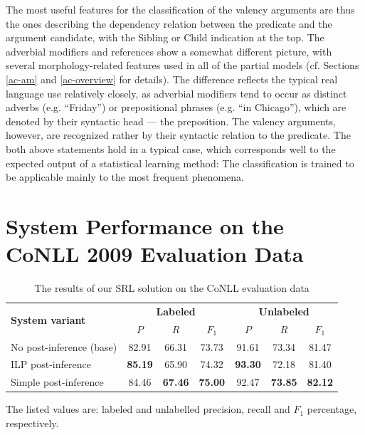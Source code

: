 \documentclass[12pt,notitlepage]{report}
\begin{document}
The most useful features for the classification of the valency arguments are thus the ones describing the dependency relation between the predicate and the argument candidate, with the Sibling or Child indication at the top. The adverbial modifiers and references show a somewhat different picture, with several morphology-related features used in all of the partial models (cf. Sections \ref{ac-am} and \ref{ac-overview} for details). The difference reflects the typical real language use relatively closely, as adverbial modifiers tend to occur as distinct adverbs (e.g. ``Friday'') or prepositional phrases (e.g. ``in Chicago''), which are denoted by their syntactic head --- the preposition. The valency arguments, however, are recognized rather by their syntactic relation to the predicate. The both above statements hold in a typical case, which corresponds well to the expected output of a statistical learning method: The classification is trained to be applicable mainly to the most frequent phenomena.

\section{System Performance on the CoNLL 2009 Evaluation Data}\label{performance}

\begin{table}[htb]\footnotesize
\caption{The results of our SRL solution on the CoNLL evaluation data}\label{tab:results}
\begin{center}
\begin{tabular}{|l|ccc|ccc|}\hline
\multirow{2}{*}{\bf System variant} & \multicolumn{3}{c|}{\bf Labeled} & \multicolumn{3}{c|}{\bf Unlabeled} \\
  & $P$ & $R$ & $F_1$ & $P$ & $R$ & $F_1$ \\\hline
No post-inference (base) & 82.91 & 66.31 & 73.73 & 91.61 & 73.34 & 81.47 \\
ILP post-inference & \bf 85.19 & 65.90 & 74.32 & \bf 93.30 & 72.18 & 81.40 \\
Simple post-inference & 84.46 & \bf 67.46 & \bf 75.00 & 92.47 & \bf 73.85 & \bf 82.12 \\\hline
\end{tabular}
\end{center}
The listed values are: labeled and unlabelled precision, recall and $F_1$ percentage, respectively.
\end{table}
\end{document}
